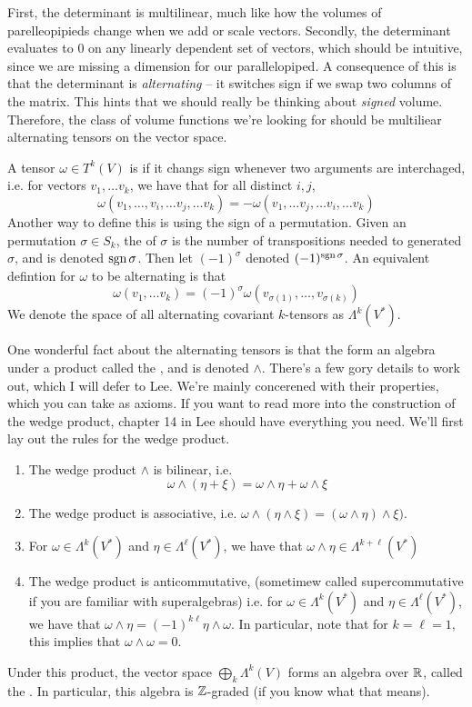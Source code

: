 First, the determinant is multilinear, much like how the volumes of
parelleopipieds change when we add or scale vectors. Secondly, the determinant
evaluates to $0$ on any linearly dependent set of vectors, which should be
intuitive, since we are missing a dimension for our parallelopiped. A
consequence of this is that the determinant is \emph{alternating} -- it
switches sign if we swap two columns of the matrix. This hints that we
should really be thinking about \emph{signed} volume. Therefore, the class
of volume functions we're looking for should be multiliear alternating
tensors on the vector space.
%
\begin{defn}
A tensor $\omega \in T^k(V)$ is  if it changs sign whenever
two arguments are interchaged, i.e. for vectors $v_1, \ldots v_k$, we have that
for all distinct $i,j$,
$$\omega(v_1,\ldots, v_i, \ldots v_j, \ldots v_k) = -\omega(v_1, \ldots v_j, \ldots v_i, \ldots v_k) $$
Another way to define this is using the sign of a permutation. Given an permutation
$\sigma \in S_k$, the  of $\sigma$ is the number of transpositions
needed to generated $\sigma$, and is denoted $\operatorname{sgn} \sigma$. Then let $(-1)^\sigma$
denoted $(-1)^{\operatorname{sgn}\sigma}$. An equivalent defintion for $\omega$ to be alternating
is that
$$\omega(v_1, \ldots v_k) = (-1)^\sigma\omega(v_{\sigma(1)}, \ldots, v_{\sigma(k)}) $$
We denote the space of all alternating covariant $k$-tensors as $\Lambda^k(V^*)$.
\end{defn}
%
One wonderful fact about the alternating tensors is that the form an algebra under
a product called the , and is denoted $\wedge$.
There's a few gory details to work out, which I will defer to Lee. We're mainly
concerened with their properties, which you can take as axioms.
If you want to read more into the construction of the wedge product,
chapter 14 in Lee should have everything you need.
%
We'll first lay out the rules for the wedge product.
\begin{enumerate}
  \item The wedge product $\wedge$ is bilinear, i.e.
  $$\omega \wedge (\eta + \xi) = \omega \wedge \eta + \omega \wedge \xi $$
  \item The wedge product is associative, i.e. $\omega \wedge (\eta \wedge \xi)
  = (\omega \wedge \eta) \wedge \xi)$.
  \item For $\omega \in \Lambda^k(V^*)$
  and $\eta \in \Lambda^\ell(V^*)$, we have that
  $\omega \wedge \eta \in \Lambda^{k + \ell}(V^*)$
  \item The wedge product is anticommutative, (sometimew called supercommutative
  if you are familiar with superalgebras) i.e. for $\omega \in \Lambda^k(V^*)$
  and $\eta \in \Lambda^\ell(V^*)$, we have that
  $\omega \wedge \eta = (-1)^{k\ell}\eta \wedge \omega$. In particular,
  note that for $k = \ell = 1$, this implies that $\omega \wedge \omega = 0$.
\end{enumerate}
%
Under this product, the vector space $\bigoplus_{k} \Lambda^k(V)$ forms an
algebra over $\mathbb{R}$, called the . In particular, this algebra
is $\mathbb{Z}$-graded (if you know what that means).

